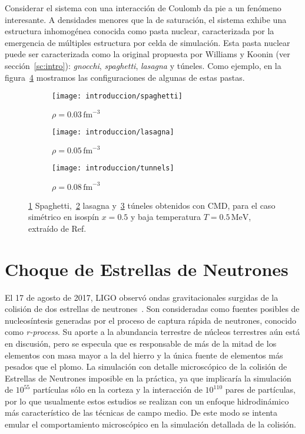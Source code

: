 Considerar el sistema con una interacción de Coulomb da pie a un fenómeno interesante.
A densidades menores que la de saturación, el sistema exhibe una estructura inhomogénea conocida como pasta nuclear, caracterizada por la emergencia de múltiples estructura por celda de simulación.
Esta pasta nuclear puede ser caracterizada como la original propuesta por Williams y Koonin (ver sección~\ref{sc:intro}): \emph{gnocchi}, \emph{spaghetti}, \emph{lasagna} y túneles.
Como ejemplo, en la figura~\ref{fig:pasta} mostramos las configuraciones de algunas de estas pastas.


\begin{figure}[h]
  \begin{subfigure}[h!]{0.48\columnwidth}
    \texttt{[image: introduccion/spaghetti]}
    \caption{$\rho = 0.03\,\text{fm}^{-3}$}
    \label{sfig:spaghetti}
  \end{subfigure}
  \begin{subfigure}[h!]{0.48\columnwidth}
    \texttt{[image: introduccion/lasagna]}
    \caption{$\rho = 0.05\,\text{fm}^{-3}$}
    \label{sfig:lasagna}
  \end{subfigure}
  \begin{subfigure}[h!]{0.48\columnwidth}
    \texttt{[image: introduccion/tunnels]}
    \caption{$\rho = 0.08\,\text{fm}^{-3}$}
    \label{sfig:tunnels}
  \end{subfigure}
  \centering
  \caption{\ref{sfig:spaghetti} Spaghetti,~\ref{sfig:lasagna} lasagna y~\ref{sfig:tunnels} túneles obtenidos con CMD, para el caso simétrico en isospín $x=0.5$ y baja temperatura $T=0.5\,\text{MeV}$, extraído de Ref.~\cite{alcain_effect_2014}}
  \label{fig:pasta}
\end{figure}

\section{Choque de Estrellas de Neutrones}

El 17 de agosto de 2017, LIGO observó ondas gravitacionales surgidas de la colisión de dos estrellas de neutrones~\cite{ligo_scientific_collaboration_and_virgo_collaboration_gw170817:_2017}.
Son consideradas como fuentes posibles de nucleosíntesis generadas por el proceso de captura rápida de neutrones, conocido como \emph{r-process}.
Su aporte a la abundancia terrestre de núcleos terrestres aún está en discusión, pero se especula que es responsable de más de la mitad de los elementos con masa mayor a la del hierro y la única fuente de elementos más pesados que el plomo.
La simulación con detalle microscópico de la colisión de Estrellas de Neutrones imposible en la práctica, ya que implicaría la simulación de $10^{55}$ partículas sólo en la corteza y la interacción de $10^{110}$ pares de partículas, por lo que usualmente estos estudios se realizan con un enfoque hidrodinámico más característico de las técnicas de campo medio.
De este modo se intenta emular el comportamiento microscópico en la simulación detallada de la colisión.

